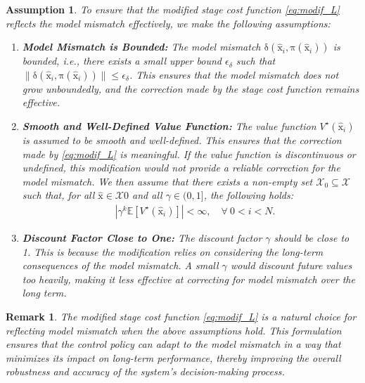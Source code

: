 \documentclass[10pt,twocolumn,twoside]{IEEEtran}
\newcommand{\vect}[1]{\ensuremath{\boldsymbol{\mathrm{#1}}}}
\newtheorem{Remark}{Remark}
\newtheorem{Assumption}{Assumption}
\begin{document}
\begin{Assumption}
    To ensure that the modified stage cost function \eqref{eq:modif_L} reflects the model mismatch effectively, we make the following assumptions:
\begin{enumerate}
\item \textbf{Model Mismatch is Bounded:} 
            The model mismatch \(\vect\delta(\hat{\vect{x}}_i, \vect{\pi}(\hat{\vect{x}}_i))\) is bounded, i.e., there exists a small upper bound \(\epsilon_{\delta}\) such that $
            \|\vect\delta(\hat{\vect{x}}_i, \vect{\pi}(\hat{\vect{x}}_i))\| \leq \epsilon_{\delta}$. This ensures that the model mismatch does not grow unboundedly, and the correction made by the stage cost function remains effective.

\item \textbf{Smooth and Well-Defined Value Function:}
            The value function \(V^\star(\hat{\vect{x}}_i)\) is assumed to be smooth and well-defined. This ensures that the correction made by \eqref{eq:modif_L} is meaningful. If the value function is discontinuous or undefined, this modification would not provide a reliable correction for the model mismatch. We then assume that there exists a non-empty set $\mathcal{X}_0 \subseteq \mathcal{X}$ such that, for all $\hat{\vect{x}} \in \mathcal{X}0$ and all $\gamma \in (0,1]$, the following holds:
\begin{align}
&\left|\gamma^{k}\mathbb{E}\left[V^\star\left(\hat{\vect{x}}_{i}\right)\right]\right| < \infty, \quad \forall\ 0 < i < N.
\end{align}

 \item \textbf{Discount Factor Close to One:}
            The discount factor \(\gamma\) should be close to 1. This is because the modification relies on considering the long-term consequences of the model mismatch. A small \(\gamma\) would discount future values too heavily, making it less effective at correcting for model mismatch over the long term.

\end{enumerate}
\end{Assumption}

\begin{Remark}
    The modified stage cost function \eqref{eq:modif_L} is a natural choice for reflecting model mismatch when the above assumptions hold. This formulation ensures that the control policy can adapt to the model mismatch in a way that minimizes its impact on long-term performance, thereby improving the overall robustness and accuracy of the system's decision-making process.
\end{Remark}
\end{document}
